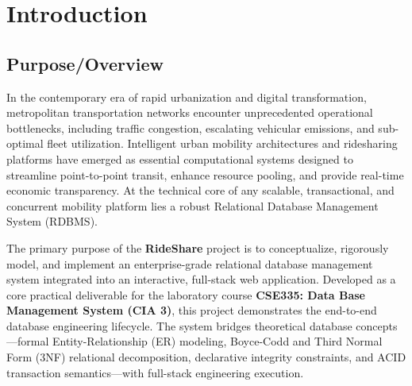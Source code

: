 \chapter{Introduction}

\section{Purpose/Overview}
In the contemporary era of rapid urbanization and digital transformation, metropolitan transportation networks encounter unprecedented operational bottlenecks, including traffic congestion, escalating vehicular emissions, and sub-optimal fleet utilization. Intelligent urban mobility architectures and ridesharing platforms have emerged as essential computational systems designed to streamline point-to-point transit, enhance resource pooling, and provide real-time economic transparency. At the technical core of any scalable, transactional, and concurrent mobility platform lies a robust Relational Database Management System (RDBMS).

The primary purpose of the \textbf{RideShare} project is to conceptualize, rigorously model, and implement an enterprise-grade relational database management system integrated into an interactive, full-stack web application. Developed as a core practical deliverable for the laboratory course \textbf{CSE335: Data Base Management System (CIA 3)}, this project demonstrates the end-to-end database engineering lifecycle. The system bridges theoretical database concepts---formal Entity-Relationship (ER) modeling, Boyce-Codd and Third Normal Form (3NF) relational decomposition, declarative integrity constraints, and ACID transaction semantics---with full-stack engineering execution.

